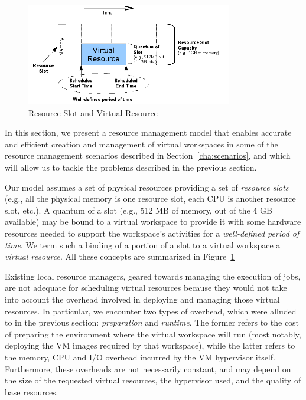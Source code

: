 \begin{figure}
  \begin{center}
    \includegraphics[width=0.8\textwidth]{figures/resourceslot.png}
    \caption{Resource Slot and Virtual Resource}
	\label{fig:resourceslot}
  \end{center}
\end{figure}

In this section, we present a resource management model that enables accurate and efficient creation and management of virtual workspaces in some of the resource management scenarios described in Section~\ref{cha:scenarios}, and which will allow us to tackle the problems described in the previous section. 

Our model assumes a set of physical resources providing a set of \emph{resource slots} (e.g., all the physical memory is one resource slot, each CPU is another resource slot, etc.). A quantum of a slot (e.g., 512 MB of memory, out of the 4 GB available) may be bound to a virtual workspace to provide it with some hardware resources needed to support the workspace's activities for a \emph{well{}-defined period of time}. We term such a binding of a portion of a slot to a virtual workspace a \emph{virtual resource}. All these concepts are summarized in Figure~\ref{fig:resourceslot}

Existing local resource managers, geared towards managing the execution of jobs, are not adequate for scheduling virtual resources because they would not take into account the overhead involved in deploying and managing those virtual resources. In particular, we encounter two types of overhead, which were alluded to in the previous section: \emph{preparation} and \emph{runtime}. The former refers to the cost of preparing the environment where the virtual workspace will run (most notably, deploying the VM images required by that workspace), while the latter refers to the memory, CPU and I/O overhead incurred by the VM hypervisor itself. Furthermore, these overheads are not necessarily constant, and may depend on the size of the requested virtual resources, the hypervisor used, and the quality of base resources.

